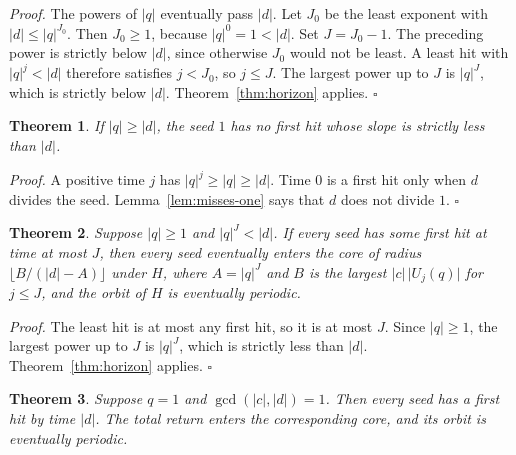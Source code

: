 \documentclass[11pt,letterpaper]{article}
\newtheorem{theorem}{Theorem}
\newenvironment{proof}{\noindent\textit{Proof.}}{\hfill\(\square\)}
\begin{document}
\begin{proof}
The powers of \(\lvert q\rvert\) eventually pass \(\lvert d\rvert\). Let \(J_0\) be the least exponent with \(\lvert d\rvert\le\lvert q\rvert^{J_0}\). Then \(J_0\ge 1\), because \(\lvert q\rvert^{0}=1<\lvert d\rvert\). Set \(J=J_0-1\). The preceding power is strictly below \(\lvert d\rvert\), since otherwise \(J_0\) would not be least. A least hit with \(\lvert q\rvert^{j}<\lvert d\rvert\) therefore satisfies \(j<J_0\), so \(j\le J\). The largest power up to \(J\) is \(\lvert q\rvert^{J}\), which is strictly below \(\lvert d\rvert\). Theorem~\ref{thm:horizon} applies.
\end{proof}

\begin{theorem}
\label{thm:nosmall}
If \(\lvert q\rvert\ge\lvert d\rvert\), the seed \(1\) has no first hit whose slope is strictly less than \(\lvert d\rvert\).
\end{theorem}

\begin{proof}
A positive time \(j\) has \(\lvert q\rvert^{j}\ge\lvert q\rvert\ge\lvert d\rvert\). Time \(0\) is a first hit only when \(d\) divides the seed. Lemma~\ref{lem:misses-one} says that \(d\) does not divide \(1\).
\end{proof}

\begin{theorem}
\label{thm:hitby}
Suppose \(\lvert q\rvert\ge 1\) and \(\lvert q\rvert^{J}<\lvert d\rvert\). If every seed has some first hit at time at most \(J\), then every seed eventually enters the core of radius \(\lfloor B/(\lvert d\rvert-A)\rfloor\) under \(H\), where \(A=\lvert q\rvert^{J}\) and \(B\) is the largest \(\lvert c\rvert\,\lvert U_j(q)\rvert\) for \(j\le J\), and the orbit of \(H\) is eventually periodic.
\end{theorem}

\begin{proof}
The least hit is at most any first hit, so it is at most \(J\). Since \(\lvert q\rvert\ge 1\), the largest power up to \(J\) is \(\lvert q\rvert^{J}\), which is strictly less than \(\lvert d\rvert\). Theorem~\ref{thm:horizon} applies.
\end{proof}

\begin{theorem}
\label{thm:unitcoprime}
Suppose \(q=1\) and \(\gcd(\lvert c\rvert,\lvert d\rvert)=1\). Then every seed has a first hit by time \(\lvert d\rvert\). The total return enters the corresponding core, and its orbit is eventually periodic.
\end{theorem}
\end{document}
